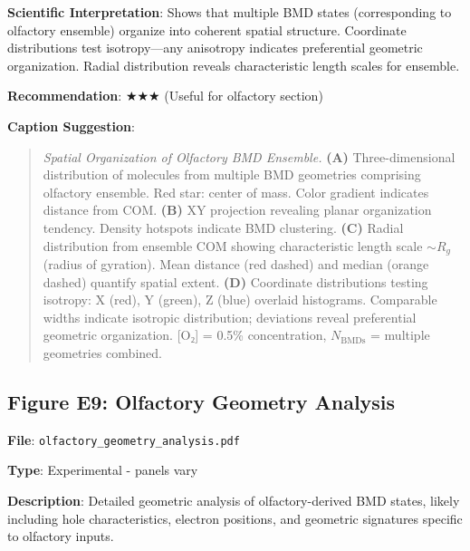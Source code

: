 \documentclass[11pt]{article}
\begin{document}
\textbf{Scientific Interpretation}:
Shows that multiple BMD states (corresponding to olfactory ensemble) organize into coherent spatial structure. Coordinate distributions test isotropy—any anisotropy indicates preferential geometric organization. Radial distribution reveals characteristic length scales for ensemble.

\textbf{Recommendation}: $\bigstar\bigstar\bigstar$ (Useful for olfactory section)

\textbf{Caption Suggestion}:
\begin{quote}
\textit{Spatial Organization of Olfactory BMD Ensemble.} \textbf{(A)} Three-dimensional distribution of  molecules from multiple BMD geometries comprising olfactory ensemble. Red star: center of mass. Color gradient indicates distance from COM. \textbf{(B)} XY projection revealing planar organization tendency. Density hotspots indicate BMD clustering. \textbf{(C)} Radial distribution from ensemble COM showing characteristic length scale $\sim R_g$ (radius of gyration). Mean distance (red dashed) and median (orange dashed) quantify spatial extent. \textbf{(D)} Coordinate distributions testing isotropy: X (red), Y (green), Z (blue) overlaid histograms. Comparable widths indicate isotropic distribution; deviations reveal preferential geometric organization. [O₂] = 0.5\% concentration, $N_{\text{BMDs}}$ = multiple geometries combined.
\end{quote}

\subsection{Figure E9: Olfactory Geometry Analysis}


\textbf{File}: \texttt{olfactory\_geometry\_analysis.pdf}

\textbf{Type}: Experimental - panels vary

\textbf{Description}:
Detailed geometric analysis of olfactory-derived BMD states, likely including hole characteristics, electron positions, and geometric signatures specific to olfactory inputs.
\end{document}
